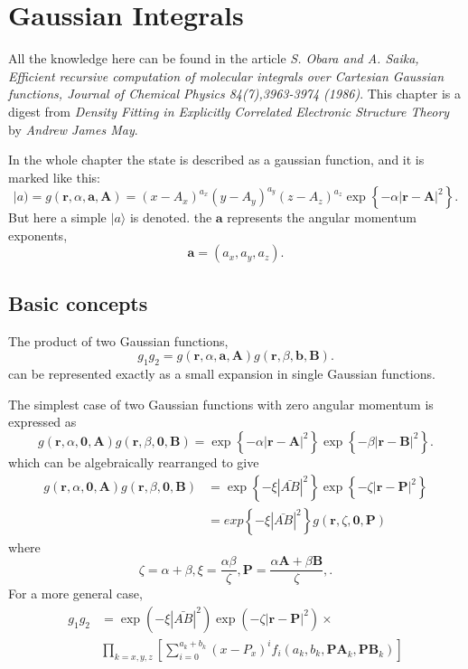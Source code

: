 \chapter{Gaussian Integrals}

All the knowledge here can be found in the article \emph{S. Obara and A. Saika, Efficient recursive computation of molecular integrals over Cartesian Gaussian functions, Journal of Chemical Physics 84(7),3963-3974 (1986)}. This chapter is a digest from \emph{Density Fitting in Explicitly Correlated Electronic Structure Theory} by \emph{Andrew James May}.

In the whole chapter the state is described as a gaussian function, and it is marked like this:
\begin{equation} 
	|a ) = g(\boldsymbol{r}, \alpha, \boldsymbol{a} ,\boldsymbol{A} ) = (x-A_x)^{a_x} (y-A_y)^{a_y} (z-A_z)^{a_z} \exp \left\{ - \alpha | \boldsymbol{r} - \boldsymbol{A} |^2  \right\}. 
\end{equation}  
But here a simple $| a \rangle $ is denoted. the  $\boldsymbol{a}$ represents the angular momentum exponents,
\[
	\boldsymbol{a} = (a_x,a_y,a_z)
.\] 

\section{Basic concepts}
\begin{theorem}
	The product of two Gaussian functions,
	\[
		g_1 g_2 = g(\boldsymbol{r},\alpha, \boldsymbol{a},\boldsymbol{A}) g(\boldsymbol{r},\beta, \boldsymbol{b}, \boldsymbol{B})
	.\] 
	can be represented exactly as a small expansion in single Gaussian functions.
\end{theorem}
The simplest case of two Gaussian functions with zero angular momentum is expressed as 
	\[
		g(\boldsymbol{r},\alpha,\boldsymbol{0},\boldsymbol{A}) g(\boldsymbol{r},\beta, \boldsymbol{0}, \boldsymbol{B} ) = \exp\left\{ -\alpha | \boldsymbol{r}-\boldsymbol{A} | ^2 \right\} \exp \left\{ - \beta |\boldsymbol{r}- \boldsymbol{B}| ^2 \right\} 
	.\] 
	which can be algebraically rearranged to give
	\begin{align*}
		g(\boldsymbol{r},\alpha,\boldsymbol{0}, \boldsymbol{A}) g(\boldsymbol{r},\beta, \boldsymbol{0}, \boldsymbol{B}) &= \exp \left\{ - \xi |\bar{AB} |^2\right\}  \exp \left\{ - \zeta |\boldsymbol{r}-\boldsymbol{P}| ^2 \right\} \\
																&= exp \left\{ - \xi |\bar{AB}|^2 \right\} g(\boldsymbol{r},\zeta, \boldsymbol{0}, \boldsymbol{P})
	\end{align*}
	where
	\[
		\zeta = \alpha+ \beta, \xi = \frac{\alpha \beta}{\zeta}, \boldsymbol{P} = \frac{\alpha \boldsymbol{A} + \beta \boldsymbol{B}}{\zeta}, 
	.\] 
For a more general case,
\begin{align*}
	g_1 g_2 & = \exp \left( -\xi |\bar{AB} |^2  \right) \exp \left( -\zeta |\boldsymbol{r} - \boldsymbol{P} | ^2 \right) \times \\
		& \prod_{k=x,y,z}\left[ \sum_{i=0}^{a_k + b_k} (x-P_x)^i f_i(a_k, b_k, \boldsymbol{PA}_k,\boldsymbol{PB}_k)\right] 
\end{align*}

